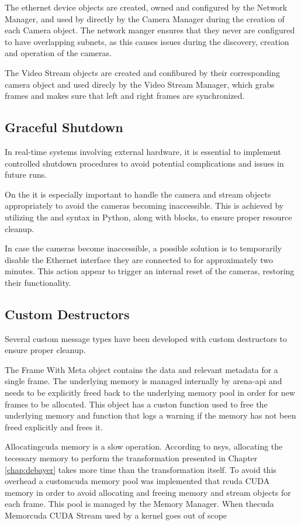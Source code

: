 The ethernet device objects are created, owned and configured by the Network Manager, and used by directly by the Camera Manager during the creation of each Camera object.
The network manger ensures that they never are configured to have overlapping subnets, as this causes issues during the discovery, creation and operation of the cameras.

The Video Stream objects are created and confibured by their corresponding camera object and used direcly by the Video Stream Manager, which grabs frames and makes sure that left and right frames are synchronized.

\subsection{Graceful Shutdown}
In real-time systems involving external hardware, it is essential to implement controlled shutdown procedures to avoid potential complications and issues in future runs.

On the \sr it is especially important to handle the camera and stream objects appropriately to avoid the cameras becoming inaccessible.
This is achieved by utilizing the  and  syntax in Python, along with  blocks, to ensure proper resource cleanup.

In case the cameras become inaccessible, a possible solution is to temporarily disable the Ethernet interface they are connected to for approximately two minutes.
This action appear to trigger an internal reset of the cameras, restoring their functionality.

\subsection{Custom Destructors}
Several custom message types have been developed with custom destructors to ensure proper cleanup.

The Frame With Meta object contains the data and relevant metadata for a single frame.
The underlying memory is managed internally by \gls{arena-api} and needs to be explicitly freed back to the underlying memory pool in order for new frames to be allocated.
This object has a custon  function used to free the underlying memory and  function that logs a warning if the memory has not been freed explicitly and frees it.

Allocating\gls{cuda} memory is a slow operation.
According to \gls{nsys}, allocating the tecessary memory to perform the transformation presented in Chapter \ref{chap:debayer} takes more time than the transformation itself.
To avoid this overhead a custom\gls{cuda} memory pool was implemented that r\gls{cuda} CUDA memory in order to avoid allocating and freeing memory and stream objects for each frame.
This pool is managed by the Memory Manager.
When the\gls{cuda} Memor\gls{cuda} CUDA Stream used by a kernel goes out of scope

